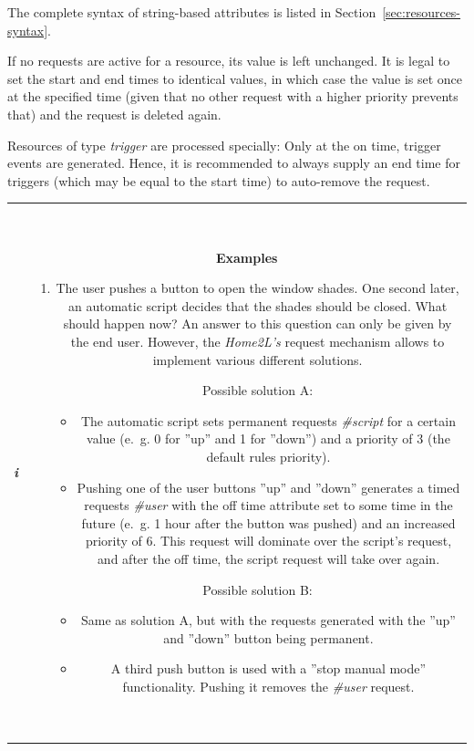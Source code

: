 \documentclass[12pt,english,parskip=half,headheight=19pt]{scrreprt}
\newcommand{\infobox}[1]{
  \par
  \medskip
  \hfill
  \setlength\arrayrulewidth{1pt}
  \begin{tabular}[t]{c|c|}
    \parbox{1.8em}{\hfill\textit{\Huge\textbf{i}\,}}
    &
    \,\parbox{0.89\linewidth}{\setlength{\parskip}{0.5em} \small #1}\,
  \end{tabular}
  \medskip
  \par
}
\begin{document}
The complete syntax of string-based attributes is listed in Section~\ref{sec:resources-syntax}.

If no requests are active for a resource, its value is left unchanged. It is legal to set the start and end times to identical values, in which case the value is set once at the specified time (given that no other request with a higher priority prevents that) and the request is deleted again.

Resources of type \textit{trigger} are processed specially: Only at the on time, trigger events are generated. Hence, it is
recommended to always supply an end time for triggers (which may be equal to the start time) to auto-remove the request.


\infobox{
  \textbf{Examples}

  \begin{enumerate}

  \item
    The user pushes a button to open the window shades. One second later,
    an automatic script decides that the shades should be closed. What should happen now?
    An answer to this question can only be given by the end user. However, the
    \textit{Home2L's} request mechanism allows to implement various different
    solutions.

    Possible solution A:
    \begin{itemize}
      \item The automatic script sets permanent requests \textit{\#script}
        for a certain value (e.~g. 0 for ''up'' and 1 for ''down'') and a priority
        of 3 (the default rules priority).
      \item Pushing one of the user buttons ''up'' and ''down'' generates a timed requests
        \textit{\#user} with the off time attribute set to some time in the future
        (e.~g. 1 hour after the button was pushed)
        and an increased priority of 6. This request will dominate over the script's
        request, and after the off time, the script request will take over again.
    \end{itemize}

    Possible solution B:
    \begin{itemize}
      \item Same as solution A, but with the requests generated with the ''up'' and
        ''down'' button being permanent.
      \item A third push button is used with a ''stop manual mode'' functionality.
        Pushing it removes the \textit{\#user} request.
    \end{itemize}


\end{enumerate}}
\end{document}
